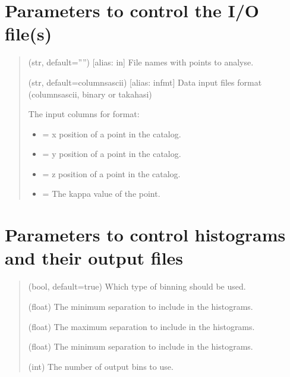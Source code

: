 \documentclass[letterpaper,10pt,english]{sphinxmanual}
\begin{document}
\section{Parameters to control the I/O file(s)}
\label{\detokenize{params:parameters-to-control-the-i-o-file-s}}\begin{quote}\begin{description}
\sphinxAtStartPar
(str, default=””) {[}alias: in{]} File names with points to analyse.

\sphinxAtStartPar
(str, default=columns\sphinxhyphen{}ascii) {[}alias: infmt{]} Data input files format (columns\sphinxhyphen{}ascii, binary or takahasi)

\sphinxAtStartPar
The input columns for  format:
\begin{itemize}
\item {} 
\sphinxAtStartPar
{} = x position of a point in the catalog.

\item {} 
\sphinxAtStartPar
{} = y position of a point in the catalog.

\item {} 
\sphinxAtStartPar
{} = z position of a point in the catalog.

\item {} 
\sphinxAtStartPar
{} = The kappa value of the point.

\end{itemize}

\end{description}\end{quote}


\section{Parameters to control histograms and their output files}
\label{\detokenize{params:parameters-to-control-histograms-and-their-output-files}}\begin{quote}\begin{description}
\sphinxAtStartPar
(bool, default=true) Which type of binning should be used.

\sphinxAtStartPar
(float) The minimum separation to include in the histograms.

\sphinxAtStartPar
(float) The maximum separation to include in the histograms.

\sphinxAtStartPar
(float) The minimum separation to include in the histograms.

\sphinxAtStartPar
(int) The number of output bins to use.

\end{description}\end{quote}
\end{document}
